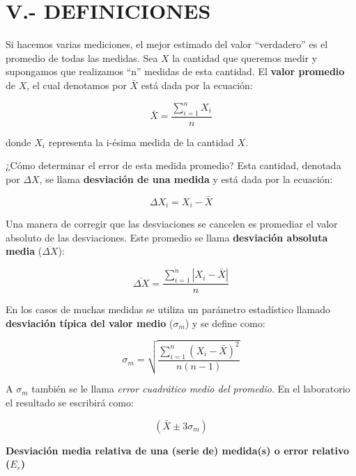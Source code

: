 \documentclass[12pt,a4paper]{article}
\begin{document}
\section{V.- DEFINICIONES}

Si hacemos varias mediciones, el mejor estimado del valor ``verdadero'' es el promedio de todas las medidas. Sea $X$ la cantidad que queremos medir y supongamos que realizamos ``n'' medidas de esta cantidad. El \textbf{valor promedio} de $X$, el cual denotamos por $\bar{X}$ está dada por la ecuación:

\begin{equation}
\bar{X} = \frac{\sum_{i=1}^{n} X_i}{n} \tag{5}
\end{equation}

donde $X_i$ representa la i-ésima medida de la cantidad $X$.

¿Cómo determinar el error de esta medida promedio? Esta cantidad, denotada por $\Delta X$, se llama \textbf{desviación de una medida} y está dada por la ecuación:

\begin{equation}
\Delta X_i = X_i - \bar{X} \tag{6}
\end{equation}

Una manera de corregir que las desviaciones se cancelen es promediar el valor absoluto de las desviaciones. Este promedio se llama \textbf{desviación absoluta media} ($\overline{\Delta X}$):

\begin{equation}
\overline{\Delta X} = \frac{\sum_{i=1}^{n} | X_i - \bar{X} |}{n} \tag{7}
\end{equation}

En los casos de muchas medidas se utiliza un parámetro estadístico llamado \textbf{desviación típica del valor medio} ($\sigma_m$) y se define como:

\begin{equation}
\sigma_m = \sqrt{ \frac{\sum_{i=1}^{n} (X_i - \bar{X})^2}{n(n-1)} } \tag{8}
\end{equation}

A $\sigma_m$ también se le llama \textit{error cuadrático medio del promedio}. En el laboratorio el resultado se escribirá como:

\begin{equation}
(\bar{X} \pm 3\sigma_m) \tag{9}
\end{equation}

\textbf{Desviación media relativa de una (serie de) medida(s) o error relativo ($E_r$)}
\end{document}
